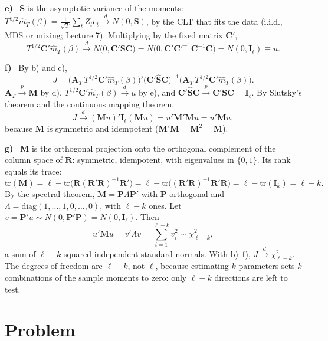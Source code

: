 \documentclass[11pt]{article}
\newcommand{\symbf}[1]{\boldsymbol{#1}}
\newcounter{problem}
\renewcommand{\theproblem}{\arabic{problem}}
\newcommand{\problem}{
	\stepcounter{problem}
	\section*{Problem \theproblem}
}
\newcommand{\itm}[1]{\par\textbf{#1)}\ }
\begin{document}
\itm{e}
$\symbf S$ is the asymptotic variance of the moments: $T^{1/2}\hat m_T(\beta)=\frac1{\sqrt T}\sum_tZ_te_t\xrightarrow{d}N(0,\symbf S)$, by the CLT that fits the data (i.i.d., MDS or mixing; Lecture 7). Multiplying by the fixed matrix $\symbf C'$,
\[
T^{1/2}\symbf C'\hat m_T(\beta)\xrightarrow{d}N\big(0,\symbf C'\symbf S\symbf C\big)=N\big(0,\symbf C'\symbf C'^{-1}\symbf C^{-1}\symbf C\big)=N(0,\symbf I_\ell)\equiv u .
\]

\itm{f}
By b) and c),
\[
J=\big(\symbf A_T\,T^{1/2}\symbf C'\hat m_T(\beta)\big)'\big(\symbf C'\hat{\symbf S}\symbf C\big)^{-1}\big(\symbf A_T\,T^{1/2}\symbf C'\hat m_T(\beta)\big).
\]
$\symbf A_T\xrightarrow{p}\symbf M$ by d), $T^{1/2}\symbf C'\hat m_T(\beta)\xrightarrow{d}u$ by e), and $\symbf C'\hat{\symbf S}\symbf C\xrightarrow{p}\symbf C'\symbf S\symbf C=\symbf I_\ell$. By Slutsky's theorem and the continuous mapping theorem,
\[
J\xrightarrow{d}(\symbf Mu)'\symbf I_\ell(\symbf Mu)=u'\symbf M'\symbf Mu=u'\symbf Mu,
\]
because $\symbf M$ is symmetric and idempotent ($\symbf M'\symbf M=\symbf M^2=\symbf M$).

\itm{g}
$\symbf M$ is the orthogonal projection onto the orthogonal complement of the column space of $\symbf R$: symmetric, idempotent, with eigenvalues in $\{0,1\}$. Its rank equals its trace:
\[
\mathrm{tr}(\symbf M)=\ell-\mathrm{tr}\big(\symbf R(\symbf R'\symbf R)^{-1}\symbf R'\big)=\ell-\mathrm{tr}\big((\symbf R'\symbf R)^{-1}\symbf R'\symbf R\big)=\ell-\mathrm{tr}(\symbf I_k)=\ell-k .
\]
By the spectral theorem, $\symbf M=\symbf P\Lambda\symbf P'$ with $\symbf P$ orthogonal and $\Lambda=\mathrm{diag}(1,\dots,1,0,\dots,0)$, with $\ell-k$ ones. Let $v=\symbf P'u\sim N(0,\symbf P'\symbf P)=N(0,\symbf I_\ell)$. Then
\[
u'\symbf Mu=v'\Lambda v=\sum_{i=1}^{\ell-k}v_i^2\sim\chi^2_{\ell-k},
\]
a sum of $\ell-k$ squared independent standard normals. With b)--f), $J\xrightarrow{d}\chi^2_{\ell-k}$. The degrees of freedom are $\ell-k$, not $\ell$, because estimating $k$ parameters sets $k$ combinations of the sample moments to zero: only $\ell-k$ directions are left to test.

\problem
\end{document}
